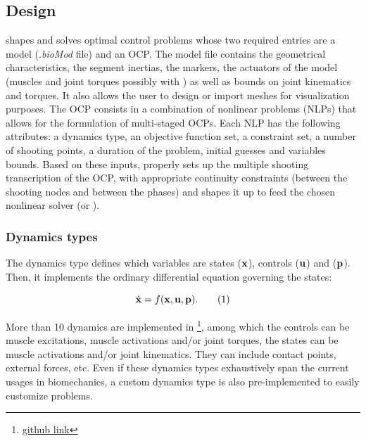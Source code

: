 \subsection{Design}
\bioptim shapes and solves optimal control problems whose two required entries are a model (.\textit{bioMod} file) and an OCP.
The model file contains the geometrical characteristics, the segment inertias, the markers, the actuators of the model (muscles and joint torques possibly with ) as well as bounds on joint kinematics and torques. 
It also allows the user to design or import meshes for visualization purposes.
The OCP consists in a combination of nonlinear problems (NLPs) that allows for the formulation of multi-staged OCPs. 
Each NLP has the following attributes: a dynamics type, an objective function set, a constraint set, a number of shooting points, a duration of the problem, initial guesses and variables bounds.
Based on these inputs, \bioptim properly sets up the multiple shooting transcription of the OCP, with appropriate continuity constraints (between the shooting nodes and between the phases) and shapes it up to feed the chosen nonlinear solver (\ipopt or \acados). 

\subsubsection{Dynamics types}
The dynamics type defines which variables are states ($\mathbf{x}$), controls ($\mathbf{u}$) and  ($\mathbf{p}$).
Then, it implements the ordinary differential equation governing the states:

\[
\dstate = f(\state, \control, \param).
\addtag
\label{eq:state_transition}
\]

\noindent More than 10 dynamics are implemented in \bioptim \footnote{\href{https://github.com/pyomeca/bioptim/blob/master/bioptim/dynamics/dynamics_functions.py}{github link}}, among which the controls can be muscle excitations, muscle activations and/or joint torques, the states can be muscle activations and/or joint kinematics.
They can include contact points, external forces, etc.
Even if these dynamics types exhaustively span the current usages in biomechanics, a custom dynamics type is also pre-implemented to easily customize problems.

